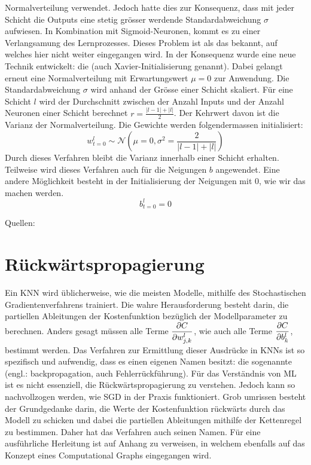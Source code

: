 Normalverteilung verwendet. Jedoch hatte dies zur Konsequenz, dass mit jeder Schicht die
Outputs eine stetig grösser werdende Standardabweichung $\sigma$ aufwiesen.
In Kombination mit Sigmoid-Neuronen, kommt es zu einer Verlangsamung des
Lernprozesses. Dieses Problem ist als das  bekannt,
auf welches hier nicht weiter eingegangen wird.
\para{}
In der Konsequenz wurde eine neue Technik entwickelt: die 
(auch Xavier-Initialisierung genannt). Dabei gelangt erneut eine Normalverteilung
mit Erwartungswert $\mu = 0$ zur Anwendung. Die Standardabweichung $\sigma$ wird
anhand der Grösse einer Schicht skaliert.
Für eine Schicht $l$ wird der Durchschnitt zwischen der Anzahl Inputs
und der Anzahl Neuronen einer Schicht berechnet $r = \frac{|l-1| + |l|}{2}$. Der Kehrwert
davon ist die Varianz der Normalverteilung.
Die Gewichte werden folgendermassen initialisiert:
\begin{equation}
  w_{t=0}^l \sim \mathcal{N}\left(\mu = 0, \sigma^2 = \frac{2}{|l-1| + |l|}\right)
\end{equation}
Durch dieses Verfahren bleibt die Varianz innerhalb einer Schicht erhalten.
Teilweise wird dieses Verfahren auch für die Neigungen $b$ angewendet. Eine
andere Möglichkeit besteht in der Initialisierung der Neigungen mit 0, wie wir
das machen werden.
\begin{equation}
  b_{t=0}^l = 0
\end{equation}

\para{}
Quellen: \cite{wiki:normal_distribution} \cite{Nielsen} \cite{book:hands-on}

\section{Rückwärtspropagierung}\label{sec:backpropagation}
Ein KNN wird üblicherweise, wie die meisten Modelle, mithilfe des Stochastischen
Gradientenverfahrens trainiert.
Die wahre Herausforderung besteht darin, die partiellen Ableitungen der
Kostenfunktion bezüglich der Modellparameter zu berechnen.
Anders gesagt müssen alle Terme
$\displaystyle\frac{\partial C}{\partial w_{j,k}^l}$, wie auch alle Terme $\displaystyle\frac{\partial C}{\partial b_k^l}$,
bestimmt werden.
Das Verfahren zur Ermittlung dieser Ausdrücke in KNNs ist so spezifisch und aufwendig,
dass es einen eigenen Namen besitzt: die sogenannte  (engl.: backpropagation, auch
Fehlerrückführung).
\para{}
Für das Verständnis von ML ist es nicht essenziell, die Rückwärtspropagierung zu
verstehen. Jedoch kann so nachvollzogen werden, wie SGD in der Praxis funktioniert.
Grob umrissen besteht der Grundgedanke darin, die Werte der Kostenfunktion
rückwärts durch das Modell zu schicken und dabei die partiellen Ableitungen
mithilfe der Kettenregel zu bestimmen. Daher hat das Verfahren auch seinen Namen.
\para{}
Für eine ausführliche Herleitung ist auf Anhang
 zu verweisen, in welchem ebenfalls auf das Konzept eines
Computational Graphs eingegangen wird.

